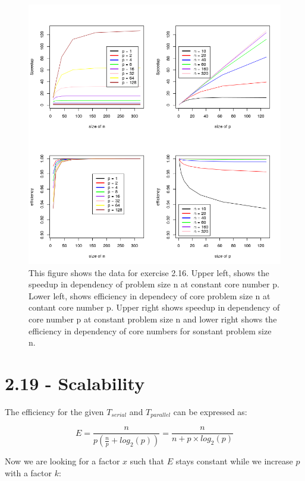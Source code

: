 \documentclass[a4paper,11pt,twoside]{article}
\begin{document}
\begin{figure}
  
  \centering
    \includegraphics[width=1\textwidth]{speedup.png}
    \caption{This figure shows the data for exercise 2.16. Upper left, shows the speedup in dependency of problem size n at constant core number p. Lower left, shows efficiency in dependecy of core problem size n at contant core number p. Upper right shows speedup in dependency of core number p at constant problem size n and lower right shows the efficiency in dependency of core numbers for sonstant problem size n.}
    \label{fig:speedup}
\end{figure}

\section{2.19 - Scalability}
The efficiency for the given $T_{serial}$ and $T_{parallel}$ can be expressed as:

\begin{equation*}
E = \frac{n}{p (\frac{n}{p} + log_{2}(p))} = \frac{n}{n + p \times log_{2}(p)}   
\end{equation*}

Now we are looking for a factor $x$ such that $E$ stays constant while we increase $p$ with a factor $k$:
\end{document}
